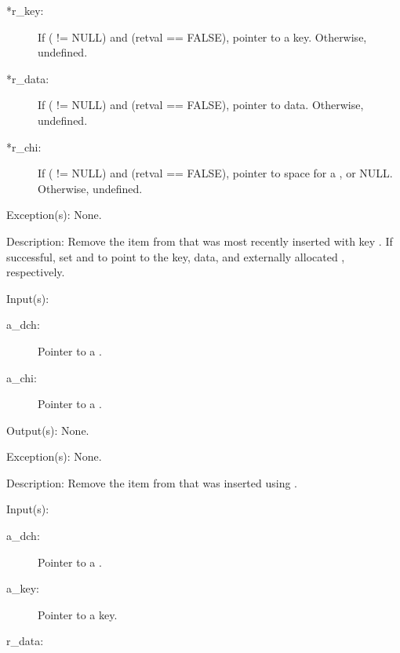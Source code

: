 \begin{capi}
\begin{capilist}
\begin{description}
\begin{description}
			\end{description}
		\item[*r\_key: ]
			If ( != NULL) and (retval == FALSE),
			pointer to a key.  Otherwise, undefined.
		\item[*r\_data: ]
			If ( != NULL) and (retval == FALSE),
			pointer to data.  Otherwise, undefined.
		\item[*r\_chi: ]
			If ( != NULL) and (retval == FALSE),
			pointer to space for a , or NULL.
			Otherwise, undefined.
		\end{description}
	\item[Exception(s): ] None.
	\item[Description: ]
		Remove the item from  that was most recently
		inserted with key .  If successful, set
		 and  to point to the key, data,
		and externally allocated , respectively.
	\end{capilist}
\label{dch_chi_remove}
	\begin{capilist}
	\item[Input(s): ]
		\begin{description}\item[]
		\item[a\_dch: ]
			Pointer to a .
		\item[a\_chi: ]
			Pointer to a .
		\end{description}
	\item[Output(s): ] None.
	\item[Exception(s): ] None.
	\item[Description: ]
		Remove the item from  that was inserted using
		.
	\end{capilist}
\label{dch_search}
	\begin{capilist}
	\item[Input(s): ]
		\begin{description}\item[]
		\item[a\_dch: ]
			Pointer to a \classname{dch}.
		\item[a\_key: ]
			Pointer to a key.
		\item[r\_data: ]

\end{description}
\end{capilist}
\end{capi}
